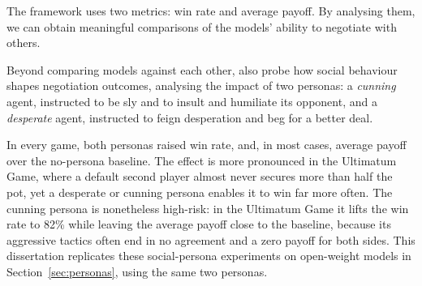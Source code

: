 
The framework uses two metrics: win rate and average payoff. By analysing them, we can obtain meaningful comparisons of the models' ability to negotiate with others.

Beyond comparing models against each other, \textcite{bianchi_how_2024} also probe how social behaviour shapes negotiation outcomes, analysing the impact of two personas: a \textit{cunning} agent, instructed to be sly and to insult and humiliate its opponent, and a \textit{desperate} agent, instructed to feign desperation and beg for a better deal.  

In every game, both personas raised win rate, and, in most cases, average payoff over the no-persona baseline. The effect is more pronounced in the Ultimatum Game, where a default second player almost never secures more than half the pot, yet a desperate or cunning persona enables it to win far more often. The cunning persona is nonetheless high-risk: in the Ultimatum Game it lifts the win rate to 82\% while leaving the average payoff close to the baseline, because its aggressive tactics often end in no agreement and a zero payoff for both sides. This dissertation replicates these social-persona experiments on open-weight models in Section~\ref{sec:personas}, using the same two personas.

